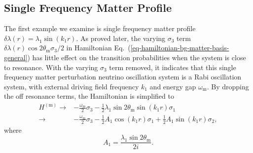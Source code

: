 \documentclass[%
reprint,
 amsmath,amssymb,
 aps,
]{revtex4-1}
\begin{document}





\subsection{\label{sec:single-freq}Single Frequency Matter Profile}


The first example we examine is single frequency matter profile $\delta\lambda(r) = \lambda_1 \sin(k_1 r)$. As proved later, the varying $\sigma_3$ term $\delta\lambda(r) \cos 2\theta_{\mathrm m} \sigma_3/2$ in Hamiltonian Eq.~(\ref{eq-hamiltonian-bg-matter-basis-general}) has little effect on the transition probabilities when the system is close to resonance. With the varying $\sigma_3$ term removed, it indicates that this single frequency matter perturbation neutrino oscillation system is a Rabi oscillation system, with external driving field frequency $k_1$ and energy gap $\omega_{\mathrm m}$. By dropping the off resonance terms, the Hamiltonian is simplified to
\begin{align}
H^{(\mathrm{m})} \to & -\frac{\omega_{\mathrm m}}{2} \sigma_3  - \frac{1}{2} \lambda_1 \sin 2\theta_{\mathrm m} \sin( k_1 r ) \sigma_1\label{eq-hamiltonian-bg-matter-basis-single-frequency} \\
\to & -\frac{\omega_{\mathrm m}}{2} \sigma_3  - \frac{1}{2} A_1 \cos ( k_1 r)  \sigma_1 + \frac{1}{2} A_1\sin(k_1 r) \sigma_2,\nonumber 
\end{align}
where
\begin{equation}
A_1 = \frac{\lambda_1 \sin 2\theta_{\mathrm m} }{2i}.
\label{eq-define-a1}
\end{equation}
\end{document}
